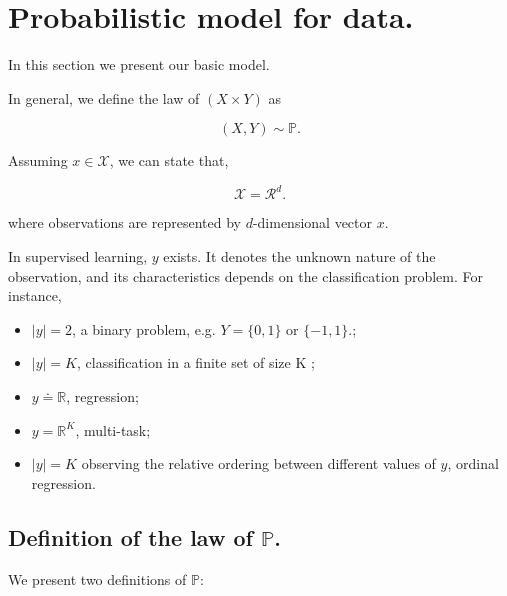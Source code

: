 	\section{Probabilistic model for data.}

		In this section we present our basic model. 
		
		In general, we define the law of $(X{\times}Y)$ as

		\begin{equation}
			(X,Y) \sim \mathbb{P}.
			\label{x_y_law}
		\end{equation}

		Assuming $x \in \mathcal{X}$, we can state that,

		\begin{equation}
			\mathcal{X} = \mathcal{R}^d.
			\label{x_example}
		\end{equation}

		where observations are represented by $d$-dimensional vector $x$. 

		In supervised learning, $y$ exists. It denotes the unknown nature of the observation, 
		and its characteristics depends on the classification problem. For instance,

		\begin{itemize}
			\item $|y|=2$, a binary problem, e.g. $Y = \{0,1\} \mbox{ or } \{-1,1\}.$;
			\item $|y|=K$, classification in a finite set of size K ;
			\item $y \doteq \mathbb{R}$, regression;
			\item $y = \mathbb{R}^K$, multi-task;
			\item $|y| = K$ observing the relative ordering between different values of $y$, ordinal regression.
		\end{itemize}
		
		\subsection{Definition of the law of $\mathbb{P}$.}

			We present two definitions of $\mathbb{P}$:

